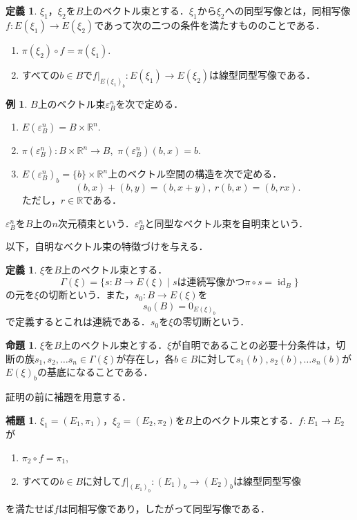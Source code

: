 \documentclass{jsarticle}
\theoremstyle{definition}
\newtheorem{definition}[theorem]{定義}
\newtheorem{proposition}[theorem]{命題}
\newtheorem{lemma}[theorem]{補題}
\newtheorem{example}[theorem]{例}
\newcommand\triv{\varepsilon_B}
\begin{document}
\begin{definition}
$\xi_1$，$\xi_2$を$B$上のベクトル束とする．$\xi_1$から$\xi_2$への同型写像とは，同相写像$f \colon E(\xi_1) \to E(\xi_2)$であって次の二つの条件を満たすもののことである．
\begin{enumerate}[label=(\arabic*)]
\item $\pi(\xi_2) \circ f = \pi(\xi_1)$.
\item すべての$b \in B$で$\left.f\right|_{E(\xi_1)_b} \colon E(\xi_1) \to E(\xi_2)$は線型同型写像である．
\end{enumerate}
\end{definition}

\begin{example}
$B$上のベクトル束$\triv^n$を次で定める．
\begin{enumerate}[label=(\arabic*)]
\item $E(\triv^n) = B \times \mathbb{R}^n$.
\item $\pi(\triv^n) \colon B \times \mathbb{R}^n \to B$,\ $\pi(\triv^n)(b,x) = b$.
\item $E(\triv^n)_b = \{b\} \times \mathbb{R}^n$上のベクトル空間の構造を次で定める．
\[ (b,x) + (b,y) = (b,x+y),\ r(b,x) = (b,rx). \]
ただし，$r \in \mathbb{R}$である．
\end{enumerate}
$\triv^n$を$B$上の$n$次元積束という．$\triv^n$と同型なベクトル束を自明束という．
\end{example}

以下，自明なベクトル束の特徴づけを与える．

\begin{definition}
$\xi$を$B$上のベクトル束とする．
\[ \Gamma(\xi) = \{s \colon B \to E(\xi) \mid s \mbox{は連続写像かつ} \pi \circ s = \operatorname{id}_B \} \]
の元を$\xi$の切断という．また，$s_0 \colon B \to E(\xi)$を
\[ s_0(B) = 0_{E(\xi)_b} \]
で定義するとこれは連続である．$s_0$を$\xi$の零切断という．
\end{definition}

\begin{proposition}\label{chartriv}
$\xi$を$B$上のベクトル束とする．$\xi$が自明であることの必要十分条件は，切断の族$s_1,s_2,\dots s_n \in \Gamma(\xi)$が存在し，各$b \in B$に対して$s_1(b),s_2(b),\dots s_n(b)$が$E(\xi)_b$の基底になることである．
\end{proposition}

証明の前に補題を用意する．

\begin{lemma}
$\xi_1=(E_1,\pi_1)$，$\xi_2=(E_2,\pi_2)$を$B$上のベクトル束とする．$f \colon E_1 \to E_2$が
\begin{enumerate}[label=(\arabic*)]
\item $\pi_2 \circ f = \pi_1$,
\item すべての$b \in B$に対して$\left.f\right|_{(E_1)_b} \colon (E_1)_b \to (E_2)_b$は線型同型写像
\end{enumerate}
を満たせば$f$は同相写像であり，したがって同型写像である．
\end{lemma}
\end{document}

